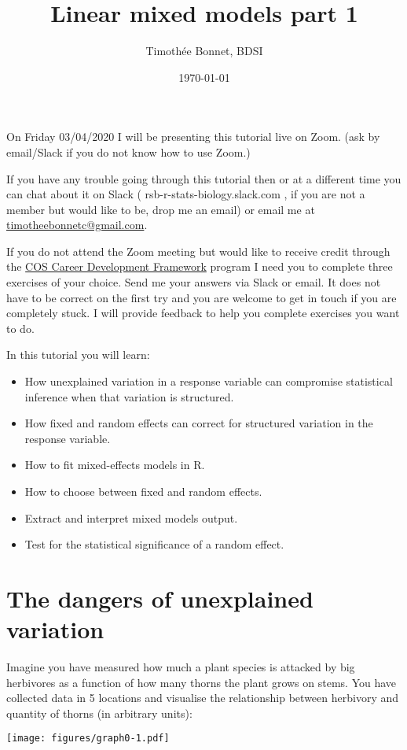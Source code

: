 \documentclass[12pt,a4paper]{scrartcl}\usepackage[]{graphicx}\usepackage[]{color}
\title{Linear mixed models part 1}
\date{\today}
\author{Timoth\'ee Bonnet, BDSI}
\begin{document}
\maketitle

On Friday 03/04/2020 I will be presenting this tutorial live on Zoom. (ask by email/Slack if you do not know how to use Zoom.)

If you have any trouble going through this tutorial then or at a different time you can chat about it on Slack ( rsb-r-stats-biology.slack.com , if you are not a member but would like to be, drop me an email) or email me at \href{mailto:timotheebonnetc@gmail.com}{timotheebonnetc@gmail.com}.

If you do not attend the Zoom meeting but would like to receive credit through the \href{https://wattlecourses.anu.edu.au/enrol/index.php?id=23938}{COS Career Development Framework} program I need you to complete three exercises of your choice. Send me your answers via Slack or email. It does not have to be correct on the first try and you are welcome to get in touch if you are completely stuck. I will provide feedback to help you complete exercises you want to do.

In this tutorial you will learn:

\begin{itemize}
    \item How unexplained variation in a response variable can compromise statistical inference when that variation is structured.
    \item How fixed and random effects can correct for structured variation in the response variable.
    \item How to fit mixed-effects models in R.
    \item How to choose between fixed and random effects.
    \item Extract and interpret mixed models output.
    \item Test for the statistical significance of a random effect.
\end{itemize}

\tableofcontents
\ListOfExerciseInToc
{}

\clearpage

\section{The dangers of unexplained variation}
Imagine you have measured how much a plant species is attacked by big herbivores as a function of how many thorns the plant grows on stems. You have collected data in 5 locations and visualise the relationship between herbivory and quantity of thorns (in arbitrary units):
\begin{center}
  \texttt{[image: figures/graph0-1.pdf]}
\end{center}
\end{document}
